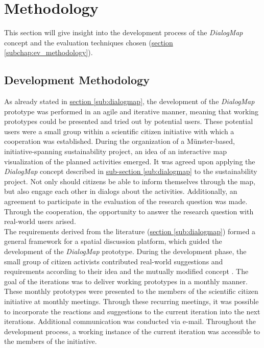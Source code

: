 \section{Methodology}
\label{chap:methodology}
This section will give insight into the development process of the \textit{DialogMap} concept and the evaluation techniques chosen (\hyperref[subchap:ev_methodology]{section \ref{subchap:ev_methodology}}).

\subsection{Development Methodology}
As already stated in \hyperref[sub:dialogmap]{section \ref{sub:dialogmap}}, the development of the \textit{DialogMap} prototype was performed in an agile and iterative manner, meaning that working prototypes could be presented and tried out by potential users. These potential users were a small group within a scientific citizen initiative  with which  a cooperation was established. During the organization of a Münster-based, initiative-spanning sustainability project, an idea of an interactive map visualization of the planned activities emerged. It was agreed upon applying the \textit{DialogMap} concept described in \hyperref[sub:dialogmap]{sub-section \ref{sub:dialogmap}} to the sustainability project. Not only should citizens be able to inform themselves through the map, but also engage each other in dialogs about the activities. Additionally, an agreement to participate in the evaluation of the research question was made. Through the cooperation, the opportunity to answer the research question with real-world users arised.\\
The requirements derived from the literature (\hyperref[sub:dialogmap]{section \ref{sub:dialogmap}}) formed a general framework for a spatial discussion platform, which guided the development of the \textit{DialogMap} prototype. During the development phase, the small group of citizen activists contributed real-world suggestions and requirements according to their idea and the mutually modified concept . The goal of the iterations was to deliver working prototypes in a monthly manner. These monthly prototypes were presented to the members of the scientific citizen initiative at monthly meetings. Through these recurring  meetings, it was possible to incorporate the reactions and suggestions to the current iteration into the next iterations. Additional communication was conducted via e-mail. Throughout the development process, a working instance of the current iteration was accessible to the members of the initiative. %

